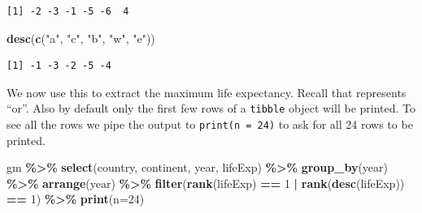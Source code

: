 \documentclass[
]{krantz}
\makeatletter
\newenvironment{Shaded}{\begin{snugshade}}{\end{snugshade}}
\newcommand{\DataTypeTok}[1]{\textcolor[rgb]{0.27,0.27,0.27}{#1}}
\newcommand{\DecValTok}[1]{\textcolor[rgb]{0.06,0.06,0.06}{#1}}
\newcommand{\KeywordTok}[1]{\textcolor[rgb]{0.27,0.27,0.27}{\textbf{#1}}}
\newcommand{\NormalTok}[1]{#1}
\newcommand{\OperatorTok}[1]{\textcolor[rgb]{0.43,0.43,0.43}{\textbf{#1}}}
\newcommand{\StringTok}[1]{\textcolor[rgb]{0.5,0.5,0.5}{#1}}
\newenvironment{kframe}{%
\medskip{}
\setlength{\fboxsep}{.8em}
 \def\at@end@of@kframe{}%
 \ifinner\ifhmode%
  \def\at@end@of@kframe{\end{minipage}}%
  \begin{minipage}{\columnwidth}%
 \fi\fi%
 \def\FrameCommand##1{\hskip\@totalleftmargin \hskip-\fboxsep
 \colorbox{shadecolor}{##1}\hskip-\fboxsep
     \hskip-\linewidth \hskip-\@totalleftmargin \hskip\columnwidth}%
 \MakeFramed {\advance\hsize-\width
   \@totalleftmargin\z@ \linewidth\hsize
   \@setminipage}}%
 {\par\unskip\endMakeFramed%
 \at@end@of@kframe}
\renewenvironment{Shaded}{\begin{kframe}}{\end{kframe}}
\makeatother
\begin{document}
\begin{verbatim}
[1] -2 -3 -1 -5 -6  4
\end{verbatim}

\begin{Shaded}
\begin{Highlighting}[]
\KeywordTok{desc}\NormalTok{(}\KeywordTok{c}\NormalTok{(}\StringTok{"a"}\NormalTok{, }\StringTok{"c"}\NormalTok{, }\StringTok{"b"}\NormalTok{, }\StringTok{"w"}\NormalTok{, }\StringTok{"e"}\NormalTok{))}
\end{Highlighting}
\end{Shaded}

\begin{verbatim}
[1] -1 -3 -2 -5 -4
\end{verbatim}

We now use this to extract the maximum life expectancy. Recall that \texttt{\textbar{}} represents ``or''. Also by default only the first few rows of a \texttt{tibble} object will be printed. To see all the rows we pipe the output to \texttt{print(n\ =\ 24)} to ask for all 24 rows to be printed.

\begin{Shaded}
\begin{Highlighting}[]
\NormalTok{gm }\OperatorTok{\%\textgreater{}\%}\StringTok{ }
\StringTok{  }\KeywordTok{select}\NormalTok{(country, continent, year, lifeExp) }\OperatorTok{\%\textgreater{}\%}\StringTok{ }
\StringTok{  }\KeywordTok{group\_by}\NormalTok{(year) }\OperatorTok{\%\textgreater{}\%}\StringTok{ }
\StringTok{  }\KeywordTok{arrange}\NormalTok{(year) }\OperatorTok{\%\textgreater{}\%}\StringTok{ }
\StringTok{  }\KeywordTok{filter}\NormalTok{(}\KeywordTok{rank}\NormalTok{(lifeExp) }\OperatorTok{==}\StringTok{ }\DecValTok{1} \OperatorTok{|}\StringTok{ }\KeywordTok{rank}\NormalTok{(}\KeywordTok{desc}\NormalTok{(lifeExp)) }\OperatorTok{==}\StringTok{ }\DecValTok{1}\NormalTok{) }\OperatorTok{\%\textgreater{}\%}\StringTok{ }
\StringTok{  }\KeywordTok{print}\NormalTok{(}\DataTypeTok{n=}\DecValTok{24}\NormalTok{)}
\end{Highlighting}
\end{Shaded}
\end{document}
